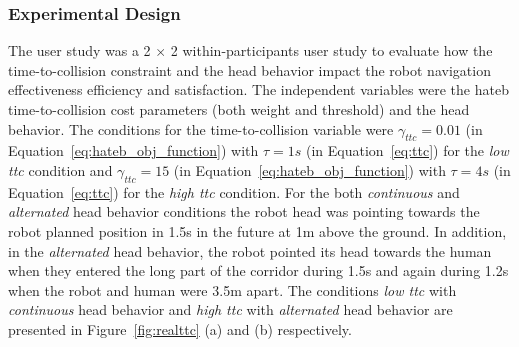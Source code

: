 \documentclass[a4paper,11pt,twoside]{StyleThese}
\begin{document}
\subsubsection{Experimental Design}
The user study was a 2 $\times$ 2 within-participants user study to evaluate how the time-to-collision constraint and the head behavior impact the robot navigation effectiveness efficiency and satisfaction. The independent variables were the \acrshort{hateb} time-to-collision cost parameters (both weight and threshold) and the head behavior. The conditions for the time-to-collision variable were $\gamma_{ttc} = 0.01$ (in Equation~\ref{eq:hateb_obj_function}) with $\tau = 1s$ (in Equation~\ref{eq:ttc})  for the \textit{low \acrshort{ttc}} condition and $\gamma_{ttc} = 15$ (in Equation~\ref{eq:hateb_obj_function}) with $\tau = 4s$ (in Equation~\ref{eq:ttc}) for the \textit{high \acrshort{ttc}} condition. For the both \textit{continuous} and \textit{alternated} head behavior conditions the robot head was pointing towards the robot planned position in 1.5s in the future at 1m above the ground. In addition, in the \textit{alternated} head behavior, the robot pointed its head towards the human when they entered the long part of the corridor during 1.5s and again during 1.2s when the robot and human were 3.5m apart. The conditions \textit{low \acrshort{ttc}} with \textit{continuous} head behavior and \textit{high \acrshort{ttc}} with \textit{alternated} head behavior are presented in Figure~\ref{fig:realttc} (a) and (b) respectively.
\end{document}
